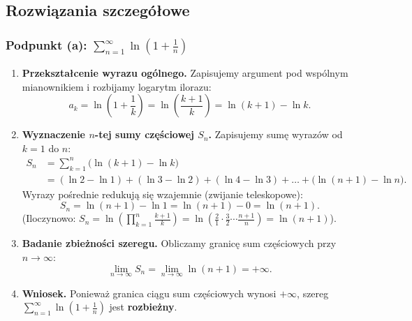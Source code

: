 \vspace{0.2cm}

\subsection*{Rozwiązania szczegółowe}

\subsubsection*{Podpunkt (a): $\displaystyle \sum_{n=1}^{\infty} \ln\left(1 + \frac{1}{n}\right)$}

\begin{enumerate}[label=\textbf{Krok \arabic*.},leftmargin=*]
    \item \textbf{Przekształcenie wyrazu ogólnego.}
    Zapisujemy argument pod wspólnym mianownikiem i rozbijamy logarytm ilorazu:
    \begin{equation*}
        a_k = \ln\left(1 + \frac{1}{k}\right) = \ln\left(\frac{k+1}{k}\right) = \ln(k+1) - \ln k.
    \end{equation*}

    \item \textbf{Wyznaczenie $n$-tej sumy częściowej $S_n$.}
    Zapisujemy sumę wyrazów od $k = 1$ do $n$:
    \begin{align*}
        S_n &= \sum_{k=1}^{n} \big( \ln(k+1) - \ln k \big) \\
        &= (\ln 2 - \ln 1) + (\ln 3 - \ln 2) + (\ln 4 - \ln 3) + \dots + \big( \ln(n+1) - \ln n \big).
    \end{align*}
    Wyrazy pośrednie redukują się wzajemnie (zwijanie teleskopowe):
    \begin{equation*}
        S_n = \ln(n+1) - \ln 1 = \ln(n+1) - 0 = \ln(n+1).
    \end{equation*}
    (Iloczynowo: $S_n = \ln\left(\prod_{k=1}^n \frac{k+1}{k}\right) = \ln\left(\frac{2}{1} \cdot \frac{3}{2} \cdots \frac{n+1}{n}\right) = \ln(n+1)$).

    \item \textbf{Badanie zbieżności szeregu.}
    Obliczamy granicę sum częściowych przy $n \to \infty$:
    \begin{equation*}
        \lim_{n \to \infty} S_n = \lim_{n \to \infty} \ln(n+1) = +\infty.
    \end{equation*}

    \item \textbf{Wniosek.}
    Ponieważ granica ciągu sum częściowych wynosi $+\infty$, szereg $\displaystyle\sum_{n=1}^{\infty} \ln\left(1 + \frac{1}{n}\right)$ jest \textbf{rozbieżny}.
\end{enumerate}


